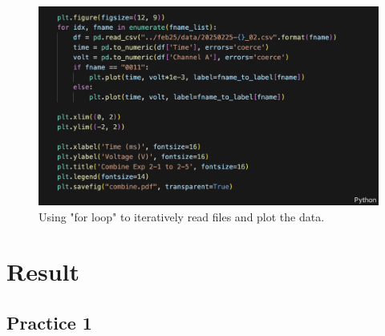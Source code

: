 \documentclass[12pt,a4paper]{article}
\begin{document}
\begin{CJK}{UTF8}{bkai}

\begin{figure}[h]
    \centering
    \includegraphics[width=0.9\linewidth]{figures/code/code_4_3.png}
    \caption{Using "for loop" to iteratively read files and plot the data.}
    \label{fig:code_4_3}
\end{figure}


\clearpage
\section{Result}\label{sec:result}

\subsection{Practice 1}


\end{CJK}
\end{document}
